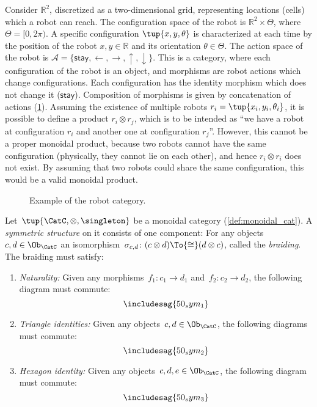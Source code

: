 \begin{example}
\label{ex:robot}
Consider $\mathbb{R}^2$, discretized as a two-dimensional grid, representing locations (cells) which a robot can reach. The configuration space of the robot is $\mathbb{R}^2\times \Theta$, where $\Theta=[0,2\pi)$. A specific configuration $\tup{x,y,\theta}$ is characterized at each time by the position of the robot $x,y\in \mathbb{R}$ and its orientation $\theta \in \Theta$. The action space of the robot is $\mathcal{A}=\{\mathsf{stay},\leftarrow, \rightarrow, \uparrow, \downarrow\}$. This is a category, where each configuration of the robot is an object, and morphisms are robot actions which change configurations. Each configuration has the identity morphism which does not change it ($\mathsf{stay}$). Composition of morphisms is given by concatenation of actions (\cref{fig:robotcategory}). Assuming the existence of multiple robots $r_i=\tup{x_i,y_i,\theta_i}$, it is possible to define a product $r_i\otimes r_j$, which is to be intended as ``we have a robot at configuration $r_i$ and another one at configuration $r_j$''. However, this cannot be a proper monoidal product, because two robots cannot have the same configuration (physically, they cannot lie on each other), and hence $r_i\otimes r_i$ does not exist. By assuming that two robots could share the same configuration, this would be a valid monoidal product.
\begin{figure}[tbh]
\begin{center}
\end{center}
\caption{Example of the robot category. \label{fig:robotcategory}}
\end{figure}
\end{example}


\begin{ctdefinition}
Let~$\tup{\CatC,\otimes,\singleton}$ be a monoidal category (\cref{def:monoidal_cat}). A \emph{symmetric structure} on it consists of one component: For any objects~$c,d\in\Ob_\CatC$ an isomorphism~$\sigma_{c,d}\colon (c\otimes d)\To{\cong}(d\otimes c)$, called the \emph{braiding}. The braiding must satisfy:
\begin{enumerate}
	\item \emph{Naturality:} Given any morphisms~$f_1\colon c_1\to d_1$ and~$f_2\colon c_2\to d_2$, the following diagram must commute:
	\begin{equation}
	\includesag{50_sym_1}
	\end{equation}
	\item \emph{Triangle identities:} Given any objects~$c,d\in\Ob_\CatC$, the following diagrams must commute:
\begin{equation}
	\includesag{50_sym_2}
\end{equation}
\item \emph{Hexagon identity:} Given any objects~$c,d,e\in \Ob_\CatC$, the following diagram must commute:
\begin{equation}
    \includesag{50_sym_3}
\end{equation}
\end{enumerate}
\end{ctdefinition} 

